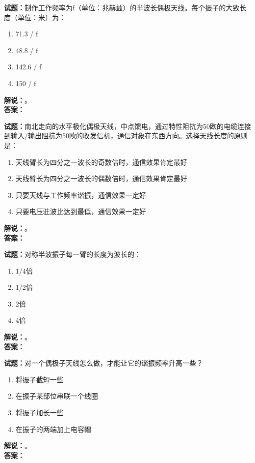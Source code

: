 \documentclass{ctexbook}
\begin{document}
\bigskip

\noindent\textbf{试题：}制作工作频率为f（单位：兆赫兹）的半波长偶极天线。每个振子的大致长度（单位：米）为：
\begin{enumerate}[leftmargin=3em]
  \item 71.3 / f
  \item 48.8 / f
  \item 142.6 / f
  \item 150 / f
\end{enumerate}
\noindent\textbf{解说：}\textbf{}。\\\noindent\textbf{答案：}

\bigskip

\noindent\textbf{试题：}南北走向的水平极化偶极天线，中点馈电，通过特性阻抗为50欧的电缆连接到输入/输出阻抗为50欧的收发信机，通信对象在东西方向。选择天线长度的原则是：
\begin{enumerate}[leftmargin=3em]
  \item 天线臂长为四分之一波长的奇数倍时，通信效果肯定最好
  \item 天线臂长为四分之一波长的偶数倍时，通信效果肯定最好
  \item 只要天线与工作频率谐振，通信效果一定好
  \item 只要电压驻波比达到最低，通信效果一定好
\end{enumerate}
\noindent\textbf{解说：}\textbf{}。\\\noindent\textbf{答案：}

\bigskip

\noindent\textbf{试题：}对称半波振子每一臂的长度为波长的：
\begin{enumerate}[leftmargin=3em]
  \item 1/4倍
  \item 1/2倍
  \item 2倍
  \item 4倍
\end{enumerate}
\noindent\textbf{解说：}\textbf{}。\\\noindent\textbf{答案：}

\bigskip

\noindent\textbf{试题：}对一个偶极子天线怎么做，才能让它的谐振频率升高一些？
\begin{enumerate}[leftmargin=3em]
  \item 将振子截短一些
  \item 在振子某部位串联一个线圈
  \item 将振子加长一些
  \item 在振子的两端加上电容帽
\end{enumerate}
\noindent\textbf{解说：}\textbf{}。\\\noindent\textbf{答案：}
\end{document}
